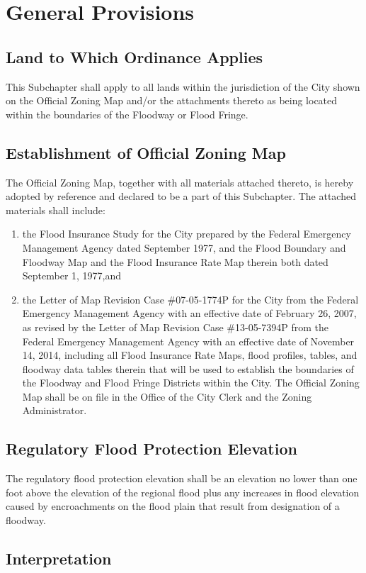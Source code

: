 \section{General Provisions}
\subsection{Land to Which Ordinance Applies}
This Subchapter shall apply to all lands within the jurisdiction of the City shown on the Official Zoning Map and/or the attachments thereto as being located within the boundaries of the Floodway or Flood Fringe.
\subsection{Establishment of Official Zoning Map}
The Official Zoning Map, together with all materials attached thereto, is hereby adopted by reference and declared to be a part of this Subchapter. The attached materials shall include:
\begin{enumerate}[{\indent}1)]
    \item the Flood Insurance Study for the City prepared by the Federal Emergency Management Agency dated September 1977, and the Flood Boundary and Floodway Map and the Flood Insurance Rate Map therein both dated September 1, 1977,and
    \item the Letter of Map Revision Case \#07-05-1774P for the City from the Federal Emergency Management Agency with an effective date of February 26, 2007, as revised by the Letter of Map Revision Case \#13-05-7394P from the Federal Emergency Management Agency with an effective date of November 14, 2014, including all Flood Insurance Rate Maps, flood profiles, tables, and floodway data tables therein that will be used to establish the boundaries of the Floodway and Flood Fringe Districts within the City. The Official Zoning Map shall be on file in the Office of the City Clerk and the Zoning Administrator.
\end{enumerate}
\subsection{Regulatory Flood Protection Elevation}
The regulatory flood protection elevation shall be an elevation no lower than one foot above the elevation of the regional flood plus any increases in flood elevation caused by encroachments on the flood plain that result from designation of a floodway.
\subsection{Interpretation}
